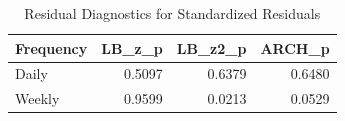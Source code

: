\begin{table}[!h]
\centering
\caption{\label{tab:tab:diag}Residual Diagnostics for Standardized Residuals}
\centering
\begin{tabular}[t]{lrrr}
\toprule
Frequency & LB\_z\_p & LB\_z2\_p & ARCH\_p\\
\midrule
Daily & 0.5097 & 0.6379 & 0.6480\\
Weekly & 0.9599 & 0.0213 & 0.0529\\
\bottomrule
\end{tabular}
\end{table}
